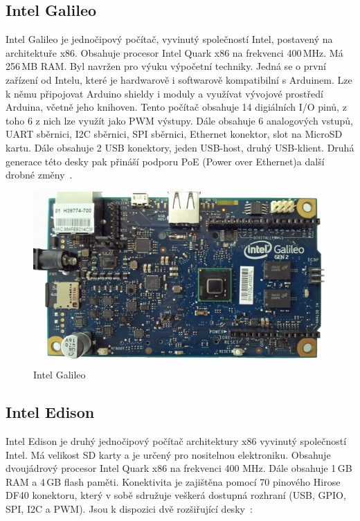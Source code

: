 		\subsection{Intel Galileo}
		Intel Galileo je jednočipový počítač, vyvinutý společností Intel, postavený na architektuře x86. Obsahuje procesor Intel Quark x86 na frekvenci 400\,MHz. Má 256\,MB RAM. Byl navržen pro výuku výpočetní techniky. Jedná se o první zařízení od Intelu, které je hardwarově i softwarově kompatibilní s Arduinem. Lze k němu připojovat Arduino shieldy i moduly a využívat vývojové prostředí Arduina, včetně jeho knihoven. 
		Tento počítač obsahuje 14 digiálních I/O pinů, z toho 6 z nich lze využít jako PWM výstupy. Dále obsahuje 6 analogových vstupů, UART sběrnici, I2C sběrnici, SPI sběrnici, Ethernet konektor, slot na MicroSD kartu. Dále obsahuje 2 USB konektory, jeden USB-host, druhý USB-klient. Druhá generace této desky pak přináší podporu PoE (Power over Ethernet)a další drobné změny~\cite{IntelGalileo,ArduinoGalileo}.
\begin{figure}[!h]
  \begin{center}
    \includegraphics[scale=0.45]{obrazky/embed_intel_galileo}
  \end{center}
  \caption{Intel Galileo~\cite{IntelGalileo}}
\end{figure}
		
		
		\subsection{Intel Edison} 
		Intel Edison je druhý jednočipový počítač architektury x86 vyvinutý společností Intel. Má velikost SD karty a je určený pro nositelnou elektroniku. Obsahuje dvoujádrový procesor Intel Quark x86 na frekvenci 400 MHz. Dále obsahuje 1\,GB RAM a 4\,GB flash paměti. Konektivita je zajištěna pomocí 70 pinového Hirose DF40 konektoru, který v sobě sdružuje veškerá dostupná rozhraní (USB, GPIO, SPI, I2C a PWM). Jsou k dispozici dvě rozšiřující desky~\cite{IntelEdison}:
			
